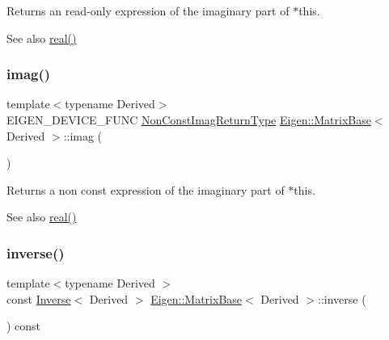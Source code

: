 \begin{DoxyReturn}{Returns}
an read-\/only expression of the imaginary part of {\ttfamily $\ast$this}.
\end{DoxyReturn}
\begin{DoxySeeAlso}{See also}
\mbox{\hyperlink{class_eigen_1_1_matrix_base_a1738254da7bde8e46bb50b47a60adff0}{real()}} 
\end{DoxySeeAlso}
\mbox{\label{class_eigen_1_1_matrix_base_aa60c37d8bb4139f7254d4fb9e2cebb68}} 
\subsubsection{\texorpdfstring{imag()}{imag()}\hspace{0.1cm}{\footnotesize\ttfamily [2/2]}}
{\footnotesize\ttfamily template$<$typename Derived$>$ \\
E\+I\+G\+E\+N\+\_\+\+D\+E\+V\+I\+C\+E\+\_\+\+F\+U\+NC \mbox{\hyperlink{class_eigen_1_1_cwise_unary_view}{Non\+Const\+Imag\+Return\+Type}} \mbox{\hyperlink{class_eigen_1_1_matrix_base}{Eigen\+::\+Matrix\+Base}}$<$ Derived $>$\+::imag (\begin{DoxyParamCaption}{ }\end{DoxyParamCaption})\hspace{0.3cm}{\ttfamily [inline]}}

\begin{DoxyReturn}{Returns}
a non const expression of the imaginary part of {\ttfamily $\ast$this}.
\end{DoxyReturn}
\begin{DoxySeeAlso}{See also}
\mbox{\hyperlink{class_eigen_1_1_matrix_base_a1738254da7bde8e46bb50b47a60adff0}{real()}} 
\end{DoxySeeAlso}
\mbox{\label{class_eigen_1_1_matrix_base_a7712eb69e8ea3c8f7b8da1c44dbdeebf}} 
\subsubsection{\texorpdfstring{inverse()}{inverse()}}
{\footnotesize\ttfamily template$<$typename Derived $>$ \\
const \mbox{\hyperlink{class_eigen_1_1_inverse}{Inverse}}$<$ Derived $>$ \mbox{\hyperlink{class_eigen_1_1_matrix_base}{Eigen\+::\+Matrix\+Base}}$<$ Derived $>$\+::inverse (\begin{DoxyParamCaption}{ }\end{DoxyParamCaption}) const\hspace{0.3cm}{\ttfamily [inline]}}

